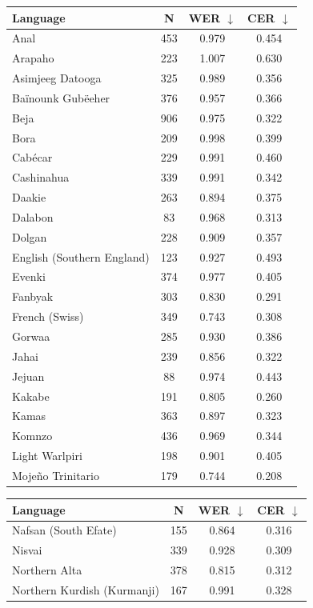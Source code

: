 \begin{table}[t]
\centering
\scriptsize
\setlength{\tabcolsep}{3pt}
\renewcommand{\arraystretch}{0.92}
\begin{tabular}{lccc}
\toprule
\textbf{Language} & \textbf{N} & \textbf{WER} $\downarrow$ & \textbf{CER} $\downarrow$ \\
\midrule
Anal & 453 & 0.979 & 0.454 \\
Arapaho & 223 & 1.007 & 0.630 \\
Asimjeeg Datooga & 325 & 0.989 & 0.356 \\
Baïnounk Gubëeher & 376 & 0.957 & 0.366 \\
Beja & 906 & 0.975 & 0.322 \\
Bora & 209 & 0.998 & 0.399 \\
Cabécar & 229 & 0.991 & 0.460 \\
Cashinahua & 339 & 0.991 & 0.342 \\
Daakie & 263 & 0.894 & 0.375 \\
Dalabon & 83 & 0.968 & 0.313 \\
Dolgan & 228 & 0.909 & 0.357 \\
English (Southern England) & 123 & 0.927 & 0.493 \\
Evenki & 374 & 0.977 & 0.405 \\
Fanbyak & 303 & 0.830 & 0.291 \\
French (Swiss) & 349 & 0.743 & 0.308 \\
Gorwaa & 285 & 0.930 & 0.386 \\
Jahai & 239 & 0.856 & 0.322 \\
Jejuan & 88 & 0.974 & 0.443 \\
Kakabe & 191 & 0.805 & 0.260 \\
Kamas & 363 & 0.897 & 0.323 \\
Komnzo & 436 & 0.969 & 0.344 \\
Light Warlpiri & 198 & 0.901 & 0.405 \\
Mojeño Trinitario & 179 & 0.744 & 0.208 \\
\bottomrule
\end{tabular}
\hfill
\begin{tabular}{lccc}
\toprule
\textbf{Language} & \textbf{N} & \textbf{WER} $\downarrow$ & \textbf{CER} $\downarrow$ \\
\midrule
Nafsan (South Efate) & 155 & 0.864 & 0.316 \\
Nisvai & 339 & 0.928 & 0.309 \\
Northern Alta & 378 & 0.815 & 0.312 \\
Northern Kurdish (Kurmanji) & 167 & 0.991 & 0.328 \\

\end{tabular}
\end{table}
